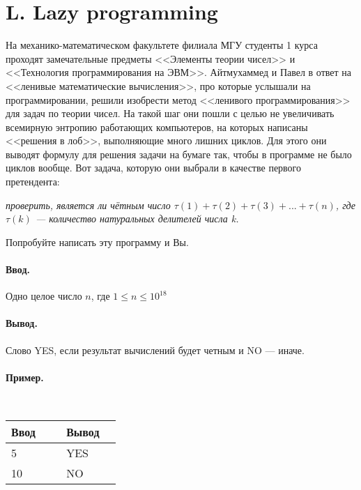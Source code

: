 \documentclass[10pt, a5paper]{article}
\newcommand{\informat}[1]
{
	\paragraph{Ввод.\\} #1
}
\newcommand{\outformat}[1]
{
	\paragraph{Вывод.\\} #1
}
\newcommand{\examplee}[4]
{
	\paragraph{Пример.\\}
	{\tt
	\begin{tabular}{|p{0.4\linewidth}|p{0.4\linewidth}|}
	\hline
	Ввод 	& Вывод  	\\
	\hline
	#1 		& #2 		\\
	\hline
	#3		& #4		\\
	\hline
	\end{tabular}
	}
}
\begin{document}
\section*{L. Lazy programming}

На механико-математическом факультете филиала МГУ студенты 1 курса проходят замечательные предметы <<Элементы теории чисел>> и <<Технология программирования на ЭВМ>>. Айтмухаммед и Павел в ответ на <<ленивые математические вычисления>>, про которые услышали на программировании, решили изобрести метод <<ленивого программирования>> для задач по теории чисел. На такой шаг они пошли с целью не увеличивать всемирную энтропию работающих компьютеров, на которых написаны <<решения в лоб>>, выполняющие много лишних циклов. Для этого они выводят формулу для решения задачи на бумаге так, чтобы в программе не было циклов вообще. Вот задача, которую они выбрали в качестве первого претендента:

\textit{проверить, является ли чётным число $\tau(1) + \tau(2) + \tau(3) + ... + \tau(n)$, \newline где $\tau(k)$ --- количество натуральных делителей числа k.}

Попробуйте написать эту программу и Вы. 

\informat{Одно целое число $n$, где $1 \le n \le 10^{18}$}

\outformat{Слово YES, если результат вычислений будет четным и NO --- иначе.}

\examplee{5}{YES}{10}{NO}
\end{document}
